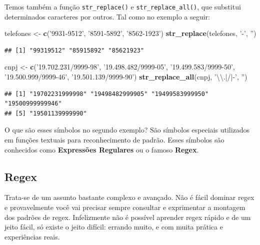\documentclass[]{book}
\newenvironment{Shaded}{\begin{snugshade}}{\end{snugshade}}
\newcommand{\KeywordTok}[1]{\textcolor[rgb]{0.13,0.29,0.53}{\textbf{#1}}}
\newcommand{\CharTok}[1]{\textcolor[rgb]{0.31,0.60,0.02}{#1}}
\newcommand{\StringTok}[1]{\textcolor[rgb]{0.31,0.60,0.02}{#1}}
\newcommand{\NormalTok}[1]{#1}
\begin{document}
Temos também a função \texttt{str\_replace()} e
\texttt{str\_replace\_all()}, que substitui determinados caracteres por
outros. Tal como no exemplo a seguir:

\begin{Shaded}
\begin{Highlighting}[]
\NormalTok{telefones <-}\StringTok{ }\KeywordTok{c}\NormalTok{(}\StringTok{'9931-9512'}\NormalTok{, }\StringTok{'8591-5892'}\NormalTok{, }\StringTok{'8562-1923'}\NormalTok{)}
\KeywordTok{str_replace}\NormalTok{(telefones, }\StringTok{'-'}\NormalTok{, }\StringTok{''}\NormalTok{)}
\end{Highlighting}
\end{Shaded}

\begin{verbatim}
## [1] "99319512" "85915892" "85621923"
\end{verbatim}

\begin{Shaded}
\begin{Highlighting}[]
\NormalTok{cnpj <-}\StringTok{ }\KeywordTok{c}\NormalTok{(}\StringTok{'19.702.231/9999-98'}\NormalTok{, }\StringTok{'19.498.482/9999-05'}\NormalTok{, }\StringTok{'19.499.583/9999-50'}\NormalTok{, }\StringTok{'19.500.999/9999-46'}\NormalTok{, }\StringTok{'19.501.139/9999-90'}\NormalTok{)}
\KeywordTok{str_replace_all}\NormalTok{(cnpj, }\StringTok{'}\CharTok{\textbackslash{}\textbackslash{}}\StringTok{.|/|-'}\NormalTok{, }\StringTok{''}\NormalTok{)}
\end{Highlighting}
\end{Shaded}

\begin{verbatim}
## [1] "19702231999998" "19498482999905" "19499583999950" "19500999999946"
## [5] "19501139999990"
\end{verbatim}

O que são esses símbolos no segundo exemplo? São símbolos especiais
utilizados em funções textuais para reconhecimento de padrão. Esses
símbolos são conhecidos como \textbf{Expressões Regulares} ou o famoso
\textbf{Regex}.

\subsection{Regex}\label{regex}

Trata-se de um assunto bastante complexo e avançado. Não é fácil dominar
regex e provavelmente você vai precisar sempre consultar e exprimentar a
montagem dos padrões de regex. Infelizmente não é possível aprender
regex rápido e de um jeito fácil, só existe o jeito difícil: errando
muito, e com muita prática e experiências reais.
\end{document}
